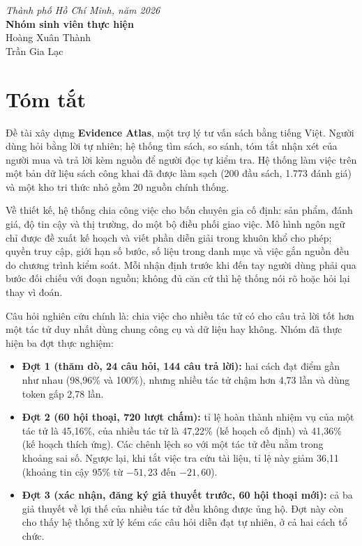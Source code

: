\documentclass[12pt,a4paper,oneside]{report}
\begin{document}
\begin{flushright}
\textit{Thành phố Hồ Chí Minh, năm 2026}\\
\textbf{Nhóm sinh viên thực hiện}\\[1cm]
Hoàng Xuân Thành\\
Trần Gia Lạc
\end{flushright}

\chapter*{Tóm tắt}

Đề tài xây dựng \textbf{Evidence Atlas}, một trợ lý tư vấn sách bằng tiếng Việt. Người dùng hỏi bằng lời tự nhiên; hệ thống tìm sách, so sánh, tóm tắt nhận xét của người mua và trả lời kèm nguồn để người đọc tự kiểm tra. Hệ thống làm việc trên một bản dữ liệu sách công khai đã được làm sạch (200 đầu sách, 1.773 đánh giá) và một kho tri thức nhỏ gồm 20 nguồn chính thống.

Về thiết kế, hệ thống chia công việc cho bốn chuyên gia cố định: sản phẩm, đánh giá, độ tin cậy và thị trường, do một bộ điều phối giao việc. Mô hình ngôn ngữ chỉ được đề xuất kế hoạch và viết phần diễn giải trong khuôn khổ cho phép; quyền truy cập, giới hạn số bước, số liệu trong danh mục và việc gắn nguồn đều do chương trình kiểm soát. Mỗi nhận định trước khi đến tay người dùng phải qua bước đối chiếu với đoạn nguồn; không đủ căn cứ thì hệ thống nói rõ hoặc hỏi lại thay vì đoán.

Câu hỏi nghiên cứu chính là: chia việc cho nhiều tác tử có cho câu trả lời tốt hơn một tác tử duy nhất dùng chung công cụ và dữ liệu hay không. Nhóm đã thực hiện ba đợt thực nghiệm:

\begin{itemize}
    \item \textbf{Đợt 1 (thăm dò, 24 câu hỏi, 144 câu trả lời):} hai cách đạt điểm gần như nhau (98,96\% và 100\%), nhưng nhiều tác tử chậm hơn 4,73 lần và dùng token gấp 2,78 lần.
    \item \textbf{Đợt 2 (60 hội thoại, 720 lượt chấm):} tỉ lệ hoàn thành nhiệm vụ của một tác tử là 45,16\%, của nhiều tác tử là 47,22\% (kế hoạch cố định) và 41,36\% (kế hoạch thích ứng). Các chênh lệch so với một tác tử đều nằm trong khoảng sai số. Ngược lại, khi tắt việc tra cứu tài liệu, tỉ lệ này giảm 36,11 \pp{} (khoảng tin cậy 95\% từ $-51{,}23$ đến $-21{,}60$).
    \item \textbf{Đợt 3 (xác nhận, đăng ký giả thuyết trước, 60 hội thoại mới):} cả ba giả thuyết về lợi thế của nhiều tác tử đều không được ủng hộ. Đợt này còn cho thấy hệ thống xử lý kém các câu hỏi diễn đạt tự nhiên, ở cả hai cách tổ chức.
\end{itemize}
\end{document}
